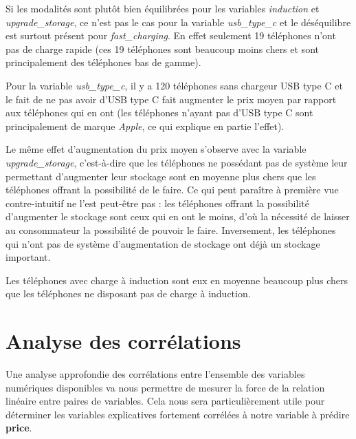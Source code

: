 \documentclass[
  12pt,
]{report}
\begin{document}
Si les modalités sont plutôt bien équilibrées pour les variables
\emph{induction} et \emph{upgrade\_storage}, ce n'est pas le cas pour la
variable \emph{usb\_type\_c} et le déséquilibre est surtout présent pour
\emph{fast\_charging}. En effet seulement 19 téléphones n'ont pas de
charge rapide (ces 19 téléphones sont beaucoup moins chers et sont
principalement des téléphones bas de gamme).

Pour la variable \emph{usb\_type\_c}, il y a 120 téléphones sans
chargeur USB type C et le fait de ne pas avoir d'USB type C fait
augmenter le prix moyen par rapport aux téléphones qui en ont (les
téléphones n'ayant pas d'USB type C sont principalement de marque
\emph{Apple}, ce qui explique en partie l'effet).

Le même effet d'augmentation du prix moyen s'observe avec la variable
\emph{upgrade\_storage}, c'est-à-dire que les téléphones ne possédant
pas de système leur permettant d'augmenter leur stockage sont en moyenne
plus chers que les téléphones offrant la possibilité de le faire. Ce qui
peut paraître à première vue contre-intuitif ne l'est peut-être pas :
les téléphones offrant la possibilité d'augmenter le stockage sont ceux
qui en ont le moins, d'où la nécessité de laisser au consommateur la
possibilité de pouvoir le faire. Inversement, les téléphones qui n'ont
pas de système d'augmentation de stockage ont déjà un stockage
important.

Les téléphones avec charge à induction sont eux en moyenne beaucoup plus
chers que les téléphones ne disposant pas de charge à induction.

\newpage

\section{Analyse des corrélations}\label{analyse-des-corruxe9lations}

Une analyse approfondie des corrélations entre l'ensemble des variables
numériques disponibles va nous permettre de mesurer la force de la
relation linéaire entre paires de variables. Cela nous sera
particulièrement utile pour déterminer les variables explicatives
fortement corrélées à notre variable à prédire \textbf{price}.
\end{document}
